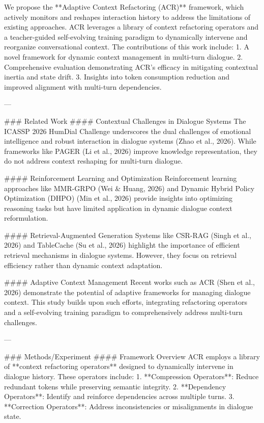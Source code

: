 We propose the **Adaptive Context Refactoring (ACR)** framework, which actively monitors and reshapes interaction history to address the limitations of existing approaches. ACR leverages a library of context refactoring operators and a teacher-guided self-evolving training paradigm to dynamically intervene and reorganize conversational context. The contributions of this work include:
1. A novel framework for dynamic context management in multi-turn dialogue.
2. Comprehensive evaluation demonstrating ACR's efficacy in mitigating contextual inertia and state drift.
3. Insights into token consumption reduction and improved alignment with multi-turn dependencies.

---

### Related Work
#### Contextual Challenges in Dialogue Systems
The ICASSP 2026 HumDial Challenge underscores the dual challenges of emotional intelligence and robust interaction in dialogue systems (Zhao et al., 2026). While frameworks like PAGER (Li et al., 2026) improve knowledge representation, they do not address context reshaping for multi-turn dialogue.

#### Reinforcement Learning and Optimization
Reinforcement learning approaches like MMR-GRPO (Wei & Huang, 2026) and Dynamic Hybrid Policy Optimization (DHPO) (Min et al., 2026) provide insights into optimizing reasoning tasks but have limited application in dynamic dialogue context reformulation.

#### Retrieval-Augmented Generation
Systems like CSR-RAG (Singh et al., 2026) and TableCache (Su et al., 2026) highlight the importance of efficient retrieval mechanisms in dialogue systems. However, they focus on retrieval efficiency rather than dynamic context adaptation.

#### Adaptive Context Management
Recent works such as ACR (Shen et al., 2026) demonstrate the potential of adaptive frameworks for managing dialogue context. This study builds upon such efforts, integrating refactoring operators and a self-evolving training paradigm to comprehensively address multi-turn challenges.

---

### Methods/Experiment
#### Framework Overview
ACR employs a library of **context refactoring operators** designed to dynamically intervene in dialogue history. These operators include:
1. **Compression Operators**: Reduce redundant tokens while preserving semantic integrity.
2. **Dependency Operators**: Identify and reinforce dependencies across multiple turns.
3. **Correction Operators**: Address inconsistencies or misalignments in dialogue state.

